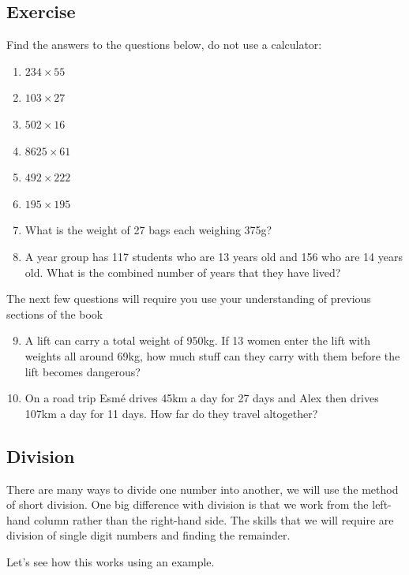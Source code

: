 \subsection{Exercise}
Find the answers to the questions below, do not use a calculator:
\begin{multicols}{2}
\begin{enumerate}
  \item $234 \times 55$
  \item $103 \times 27$
  \item $502 \times 16$
  \item $8625 \times 61$
  \item $492 \times 222$
  \item $195 \times 195$
\end{enumerate}
\end{multicols}
\begin{enumerate}
	\setcounter{enumi}{6}
	\item What is the weight of 27 bags each weighing 375g?
	\item A year group has 117 students who are 13 years old and 156 who are 14 years old.  What is the combined number of years that they have lived?
\end{enumerate}
\noindent The next few questions will require you use your understanding of previous sections of the book
\begin{enumerate}
	\setcounter{enumi}{8}
	\item A lift can carry a total weight of 950kg.  If 13 women enter the lift with weights all around 69kg, how much stuff can they carry with them before the lift becomes dangerous?
	\item On a road trip Esm\'e drives 45km a day for 27 days and Alex then drives 107km a day for 11 days.  How far do they travel altogether?
\end{enumerate}

\subsection{Division}
There are many ways to divide one number into another, we will use the method of short division.  One big difference with division is that we work from the left-hand column rather than the right-hand side.  The skills that we will require are division of single digit numbers and finding the remainder.

Let's see how this works using an example.

